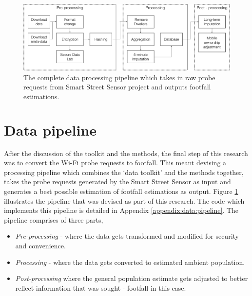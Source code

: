 
\begin{figure}
  \includegraphics[trim={0 0 0 0},clip]{images/processing-pipeline-full.png}
  \caption{The complete data processing pipeline which takes in raw probe requests from Smart Street Sensor project and outputs footfall estimations.}
  \label{figure:processing:pipeline:full}
\end{figure}

\section{Data pipeline} \label{section:pipeline}

After the discussion of the toolkit and the methods, the final step of this research was to convert the Wi-Fi probe requests to footfall. 
This meant devising a processing pipeline which combines the `data toolkit' and the methods together, takes the probe requests generated by the Smart Street Sensor as input and generates a best possible estimation of footfall estimations as output. 
Figure \ref{figure:processing:pipeline:full} illustrates the pipeline that was devised as part of this research.
The code which implements this pipeline is detailed in Appendix \ref{appendix:data:pipeline}.
The pipeline comprises of three parts,
\begin{itemize}
  \itemsep-0.25em
  \item \textit{Pre-processing} - where the data gets transformed and modified for security and convenience.
  \item \textit{Processing} - where the data gets converted to estimated ambient population.
  \item \textit{Post-processing} where the general population estimate gets adjusted to better reflect information that was sought - footfall in this case.
\end{itemize}

